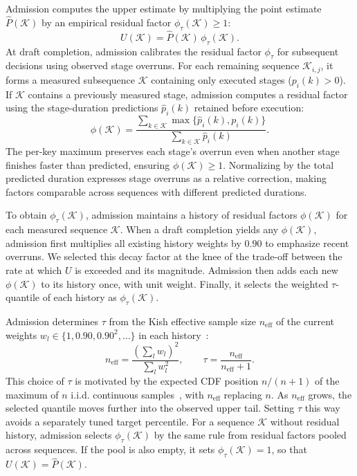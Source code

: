 Admission computes the upper estimate by multiplying the point estimate \(\hat P(\mathcal K)\) by an empirical residual factor \(\phi_\tau(\mathcal K)\geq1\):
\begin{equation*}
  U(\mathcal{K})
  =\hat P(\mathcal{K})\,\phi_{\tau}(\mathcal{K}).
\end{equation*}
At draft completion, admission calibrates the residual factor \(\phi_\tau\) for subsequent decisions using observed stage overruns.
For each remaining sequence \(\mathcal K_{i,j}\), it forms a measured subsequence \(\mathcal K\) containing only executed stages (\(p_i(k)>0\)).
If \(\mathcal K\) contains a previously measured stage, admission computes a residual factor using the stage-duration predictions \(\hat p_i(k)\) retained before execution:
\begin{equation*}
  \phi(\mathcal{K})
  =\frac{\sum_{k\in\mathcal{K}}\max\{\hat p_i(k),p_i(k)\}}
         {\sum_{k\in\mathcal{K}}\hat p_i(k)}.
\end{equation*}
The per-key maximum preserves each stage's overrun even when another stage finishes faster than predicted, ensuring \(\phi(\mathcal{K})\geq1\).
Normalizing by the total predicted duration expresses stage overruns as a relative correction, making factors comparable across sequences with different predicted durations.

To obtain \(\phi_\tau(\mathcal K)\), admission maintains a history of residual factors \(\phi(\mathcal K)\) for each measured sequence \(\mathcal K\).
When a draft completion yields any \(\phi(\mathcal K)\), admission first multiplies all existing history weights by \(0.90\) to emphasize recent overruns.
We selected this decay factor at the knee of the trade-off between the rate at which \(U\) is exceeded and its magnitude.
Admission then adds each new \(\phi(\mathcal K)\) to its history once, with unit weight.
Finally, it selects the weighted \(\tau\)-quantile of each history as \(\phi_\tau(\mathcal K)\).

Admission determines \(\tau\) from the Kish effective sample size \(n_{\mathrm{eff}}\) of the current weights \(w_l\in\{1,0.90,0.90^2,\ldots\}\) in each history~\cite{kish-survey-sampling}:
\[
  n_{\mathrm{eff}}
  =\frac{(\sum_l w_l)^2}{\sum_l w_l^2},
  \qquad
  \tau=\frac{n_{\mathrm{eff}}}{n_{\mathrm{eff}}+1}.
\]
This choice of \(\tau\) is motivated by the expected CDF position \(n/(n+1)\) of the maximum of \(n\) i.i.d. continuous samples~\cite{david-order-statistics}, with \(n_{\mathrm{eff}}\) replacing \(n\).
As \(n_{\mathrm{eff}}\) grows, the selected quantile moves further into the observed upper tail.
Setting \(\tau\) this way avoids a separately tuned target percentile.
For a sequence \(\mathcal K\) without residual history, admission selects \(\phi_\tau(\mathcal K)\) by the same rule from residual factors pooled across sequences.
If the pool is also empty, it sets \(\phi_\tau(\mathcal K)=1\), so that \(U(\mathcal K)=\hat P(\mathcal K)\).

